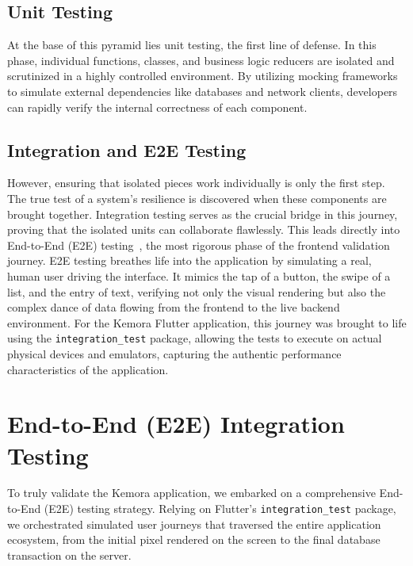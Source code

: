\subsection{Unit Testing}
At the base of this pyramid lies unit testing, the first line of defense. In this phase, individual functions, classes, and business logic reducers are isolated and scrutinized in a highly controlled environment. By utilizing mocking frameworks to simulate external dependencies like databases and network clients, developers can rapidly verify the internal correctness of each component. 

\subsection{Integration and E2E Testing}
However, ensuring that isolated pieces work individually is only the first step. The true test of a system's resilience is discovered when these components are brought together. Integration testing serves as the crucial bridge in this journey, proving that the isolated units can collaborate flawlessly. This leads directly into End-to-End (E2E) testing~\cite{e2e_testing}, the most rigorous phase of the frontend validation journey. E2E testing breathes life into the application by simulating a real, human user driving the interface. It mimics the tap of a button, the swipe of a list, and the entry of text, verifying not only the visual rendering but also the complex dance of data flowing from the frontend to the live backend environment. For the Kemora Flutter application, this journey was brought to life using the \texttt{integration\_test} package, allowing the tests to execute on actual physical devices and emulators, capturing the authentic performance characteristics of the application.

\section{End-to-End (E2E) Integration Testing}
To truly validate the Kemora application, we embarked on a comprehensive End-to-End (E2E) testing strategy. Relying on Flutter's \texttt{integration\_test} package, we orchestrated simulated user journeys that traversed the entire application ecosystem, from the initial pixel rendered on the screen to the final database transaction on the server.

